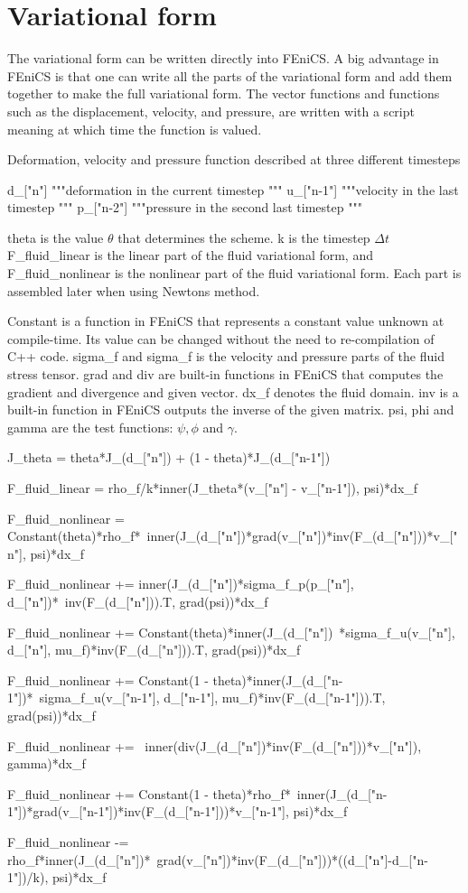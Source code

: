 \section{Variational form}

The variational form can be written directly into FEniCS. A big advantage in FEniCS is that one can write all the parts of the variational form and add them together to make the full variational form.
The vector functions and functions such as the displacement, velocity, and pressure, are written with a script  meaning at which time the function is valued. 
\begin{python}\caption{Deformation, velocity and pressure function described at three different timesteps }
d_["n"]  """deformation in the current timestep """
u_["n-1"] """velocity in the last timestep """
p_["n-2"] """pressure in the second last timestep """
\end{python}

theta is the value $\theta$ that determines the scheme.
k is the timestep $\Delta t$\\
F\_fluid\_linear is the linear part of the fluid variational form, and F\_fluid\_nonlinear is the nonlinear part of the fluid variational form. Each part is assembled later when using Newtons method. 

Constant is a function in FEniCS that represents a constant value unknown at compile-time. Its value can be changed without the need to re-compilation of C++ code.
sigma\_f and sigma\_f  is the velocity and pressure parts of the fluid stress tensor.
grad and div are built-in functions in FEniCS that computes the gradient and divergence and given vector.
dx\_f denotes the fluid domain. 
inv\(\) is a built-in function in FEniCS outputs the inverse of the given matrix. 
psi, phi and gamma are the test functions: $\psi, \phi$ and $\gamma$.

\begin{python}
J_theta = theta*J_(d_["n"]) + (1 - theta)*J_(d_["n-1"]) 

F_fluid_linear = rho_f/k*inner(J_theta*(v_["n"] - v_["n-1"]), psi)*dx_f

F_fluid_nonlinear =  Constant(theta)*rho_f*\
inner(J_(d_["n"])*grad(v_["n"])*inv(F_(d_["n"]))*v_["n"], psi)*dx_f

F_fluid_nonlinear += inner(J_(d_["n"])*sigma_f_p(p_["n"], d_["n"])*\
inv(F_(d_["n"])).T, grad(psi))*dx_f

F_fluid_nonlinear += Constant(theta)*inner(J_(d_["n"])\
*sigma_f_u(v_["n"], d_["n"], mu_f)*inv(F_(d_["n"])).T, grad(psi))*dx_f

F_fluid_nonlinear += Constant(1 - theta)*inner(J_(d_["n-1"])*\
sigma_f_u(v_["n-1"], d_["n-1"], mu_f)*inv(F_(d_["n-1"])).T, grad(psi))*dx_f

F_fluid_nonlinear += \
inner(div(J_(d_["n"])*inv(F_(d_["n"]))*v_["n"]), gamma)*dx_f

F_fluid_nonlinear += Constant(1 - theta)*rho_f*\
inner(J_(d_["n-1"])*grad(v_["n-1"])*inv(F_(d_["n-1"]))*v_["n-1"], psi)*dx_f

F_fluid_nonlinear -= rho_f*inner(J_(d_["n"])*\
grad(v_["n"])*inv(F_(d_["n"]))*((d_["n"]-d_["n-1"])/k), psi)*dx_f
\end{python}


